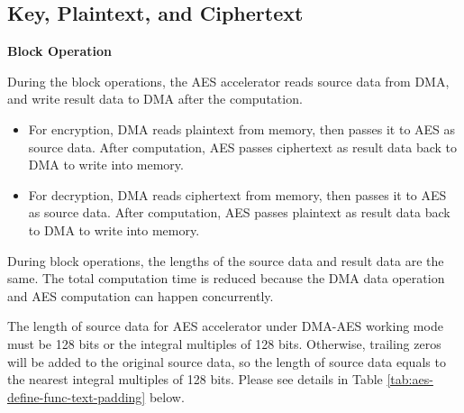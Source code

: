 \documentclass[main\_\_EN.tex]{subfiles}
\begin{document}

\subsection{Key, Plaintext, and Ciphertext}

\textbf{Block Operation}

During the block operations, the AES accelerator reads source data from DMA, and write result data to DMA after the computation.

\begin{itemize}
    \item For encryption, DMA reads plaintext from memory, then passes it to AES as source data. After computation, AES passes ciphertext as result data  back to DMA to write into memory.
    \item For decryption, DMA reads ciphertext from memory, then passes it to AES as source data. After computation, AES passes plaintext as result data back to DMA to write into memory. 
\end{itemize}

During block operations, the lengths of the source data and result data are the same. The total computation time is reduced because the DMA data operation and AES computation can happen concurrently.

\label{api:testpadding}The length of source data for AES accelerator under DMA-AES working mode must be 128 bits or the integral multiples of 128 bits. Otherwise, trailing zeros will be added to the original source data, so the length of source data equals to the nearest integral multiples of 128 bits. Please see details in Table \ref{tab:aes-define-func-text-padding} below.

\end{document}
